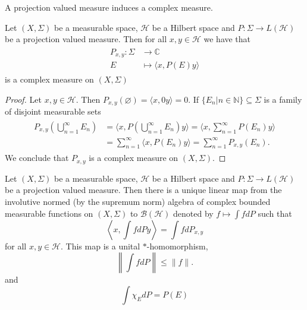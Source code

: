 A projection valued measure induces a complex measure.

\begin{theorem}
Let $(X,\Sigma)$ be a measurable space, $\mathcal{H}$ be a Hilbert space and $P:\Sigma\rightarrow L(\mathcal{H})$ be a projection valued measure. Then for all $x,y\in\mathcal{H}$ we have that
\begin{align}
\begin{split}
P_{x,y}:\Sigma&\rightarrow\mathbb{C} \\
E&\mapsto \langle x,P(E)y \rangle
\end{split}
\end{align}
is a complex measure on $(X,\Sigma)$
\end{theorem}

\begin{proof}
Let $x,y\in\mathcal{H}$. Then $P_{x,y}(\varnothing)=\langle x,0y\rangle = 0$. If $\{E_n|n\in\mathbb{N}\}\subseteq\Sigma$ is a family of disjoint measurable sets
\begin{align}
\begin{split}
P_{x,y}\left(\bigcup_{n=1}^\infty E_n\right)&=\langle x,P\left(\bigcup_{n=1}^\infty E_n\right)y\rangle =\langle x,\sum_{n=1}^\infty P(E_n)y\rangle \\
&=\sum_{n=1}^\infty\langle x, P(E_n)y\rangle=\sum_{n=1}^\infty P_{x,y}(E_n).
\end{split} 
\end{align}
We conclude that $P_{x,y}$ is a complex measure on $(X,\Sigma)$.
\end{proof}

\begin{theorem}
Let $(X,\Sigma)$ be a measurable space, $\mathcal{H}$ be a Hilbert space and $P:\Sigma\rightarrow L(\mathcal{H})$ be a projection valued measure. Then there is a unique linear map from the involutive normed (by the supremum norm) algebra of complex bounded measurable functions on $(X,\Sigma)$ to $\mathcal{B}(\mathcal{H})$ denoted by $f\mapsto\int fdP$ such that 
\begin{equation}
\left\langle x,\int fdP y\right\rangle =\int fdP_{x,y}
\end{equation} 
for all $x,y\in\mathcal{H}$. This map is a unital $*$-homomorphism,
\begin{equation}
\left\|\int f dP\right\|\leq\|f\|.
\end{equation}
and 
\begin{equation}
\int \chi_E dP=P(E)
\end{equation}
\end{theorem}

